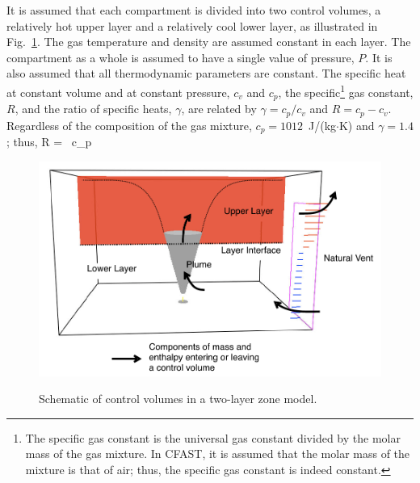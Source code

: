 \documentclass[12pt]{book}
\begin{document}
It is assumed that each compartment is divided into two control volumes, a relatively hot upper layer and a relatively cool lower layer, as illustrated in Fig.~\ref{fig:Control_Volumes}. The gas temperature and density are assumed constant in each layer. The compartment as a whole is assumed to have a single value of pressure, $P$. It is also assumed that all thermodynamic parameters are constant. The specific heat at constant volume and at constant pressure, $c_v$ and $c_p$, the specific\footnote{The specific gas constant is the universal gas constant divided by the molar mass of the gas mixture. In CFAST, it is assumed that the molar mass of the mixture is that of air; thus, the specific gas constant is indeed constant.} gas constant, $R$, and the ratio of specific heats, $\gamma$, are related by $\gamma = c_p / c_v$ and $R = c_p- c_v$. Regardless of the composition of the gas mixture, $c_p = 1012$~J/(kg$\cdot$K) and $\gamma = 1.4$; thus,
\be
   R =  \, c_p  \; 
\ee
\begin{figure}[h]
\begin{center}
\includegraphics[width=\textwidth]{FIGURES/Theory/Control_Volumes}\\
\end{center}
\caption{Schematic of control volumes in a two-layer zone model.}
 \label{fig:Control_Volumes}
\end{figure}
\end{document}
